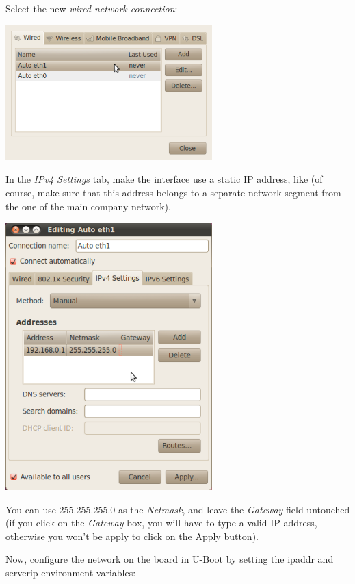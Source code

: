 Select the new {\em wired network connection}:

\begin{center}
\includegraphics[width=8cm]{labs/sysdev-u-boot/network-config-2.png}
\end{center}

In the {\em IPv4 Settings} tab, make the interface use a static IP
address, like  (of course, make sure that this
address belongs to a separate network segment from the one of the main
company network).

\begin{center}
\includegraphics[width=8cm]{labs/sysdev-u-boot/network-config-3.png}
\end{center}

You can use 255.255.255.0 as the {\em Netmask}, and leave the {\em
  Gateway} field untouched (if you click on the {\em Gateway} box, you
will have to type a valid IP address, otherwise you won't be apply to
click on the Apply button).

Now, configure the network on the board in U-Boot by setting the ipaddr and serverip environment variables:

